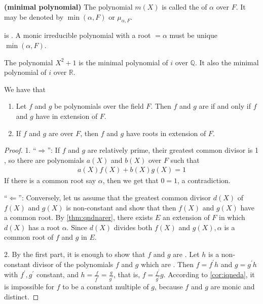 \documentclass{article}
\newcommand{\bfs}[1]{\textbf{({#1}) }}
\begin{document}
\begin{defa}\bfs{minimal polynomial}
The polynomial $m(X)$ is called the  of $\alpha$ over $F$. It may be denoted by $\min (\alpha, F)$ or $\mu_{\alpha, F}$.
\end{defa}
\begin{cora}\label{cor:iqnddad}
 is . A monic irreducible polynomial with a root $=\alpha$ must be  unique   $\min (\alpha, F)$.
\end{cora}
\begin{exma}
The polynomial $X^{2}+1$ is the minimal polynomial of $i$ over $\mathbb{Q}$. It also the minimal polynomial of $i$ over $\mathbb{R}$.
\end{exma}
\begin{lema}\label{lem:ineqadda}We have that
\begin{enumerate}
    \item Let $f$ and $g$ be polynomials over the field $F$. Then $f$ and $g$ are  if and only if $f$ and $g$ have  in  extension of $F$.
    \item  If $f$ and $g$ are  over $F$, then $f$ and $g$ have  roots in  extension of $F$.
\end{enumerate}
\end{lema}
\begin{proof}
1. ``$\Rightarrow$'': If $f$ and $g$ are relatively prime, their greatest common divisor is 1 , so there are polynomials $a(X)$ and $b(X)$ over $F$ such that
\begin{align*}
a(X) f(X)+b(X) g(X)=1
\end{align*}
If there is a common root say $\alpha$, then we get that $0=1$, a contradiction.

``$\Leftarrow$'': Conversely, let us assume that the greatest common divisor $d(X)$ of $f(X)$ and $g(X)$ is non-constant and show that then $f(X)$ and $g(X)$ have a common root. By \cref{thm:qndnarer}, there exists $E$ an extension of $F$ in which $d(X)$ has a root $\alpha$. Since $d(X)$ divides both $f(X)$ and $g(X), \alpha$ is a common root of $f$ and $g$ in $E$.

2. By the first part, it is enough to show that $f$ and $g$ are . Let $h$ is a non-constant divisor of the polynomials $f$ and $g$ which are . Then $f=f^{\prime} h$ and $g=g^{\prime} h$ with $f^{\prime}, g^{\prime}$  constant, and $h=\frac{f}{f^{\prime}}=\frac{g}{g^{\prime}}$, that is, $f=\frac{f^{\prime}}{g^{\prime}} g$. According to \cref{cor:iqneda}, it is impossible for $f$ to be a constant multiple of $g$, because $f$ and $g$ are monic and distinct.
\end{proof}
\end{document}

